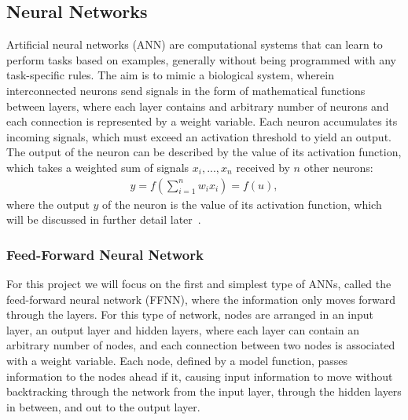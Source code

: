 \documentclass[english,notitlepage,reprint,nofootinbib]{revtex4–2}  %
\begin{document}
\subsection*{Neural Networks} %
Artificial neural networks (ANN) are computational systems that can learn to perform tasks based on examples, generally without being programmed with any task-specific rules. 
The aim is to mimic a biological system, wherein interconnected neurons send signals in the form of mathematical functions between layers, where each layer contains and arbitrary number of neurons and each connection is represented by a weight variable. Each neuron accumulates its incoming signals, which must exceed an activation threshold to yield an output. 
The output of the neuron can be described by the value of its activation function, which takes a weighted sum of signals $x_i,...,x_n$ received by $n$ other neurons: 
\begin{align}
    y = f\left(\sum\limits_{i=1}^n w_i x_i\right) = f(u), 
\end{align}
where the output $y$ of the neuron is the value of its activation function, which will be discussed in further detail later~\cite{lecture_notes}. %


\subsubsection{Feed-Forward Neural Network}
For this project we will focus on the first and simplest type of ANNs, called the feed-forward neural network (FFNN), where the information only moves forward through the layers. %
For this type of network, nodes are arranged in an input layer, an output layer and hidden layers, where each layer can contain an arbitrary number of nodes, and each connection between two nodes is associated with a weight variable. 
Each node,  defined by a model function, passes information to the nodes ahead if it, causing input information to move without backtracking through the network from the input layer, through the hidden layers in between, and out to the output layer. 
\vspace{3mm}
\\ 



\vspace{3mm}
\\ 
\end{document}
